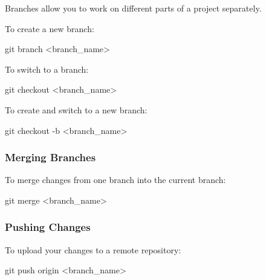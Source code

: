 \documentclass[
  letterpaper,
  DIV=11,
  numbers=noendperiod]{scrreprt}
\newenvironment{Shaded}{\begin{snugshade}}{\end{snugshade}}
\newcommand{\AttributeTok}[1]{\textcolor[rgb]{0.40,0.45,0.13}{#1}}
\newcommand{\FunctionTok}[1]{\textcolor[rgb]{0.28,0.35,0.67}{#1}}
\newcommand{\NormalTok}[1]{\textcolor[rgb]{0.00,0.23,0.31}{#1}}
\newcommand{\OperatorTok}[1]{\textcolor[rgb]{0.37,0.37,0.37}{#1}}
\begin{document}
Branches allow you to work on different parts of a project separately.

To create a new branch:

\begin{Shaded}
\begin{Highlighting}[]
\FunctionTok{git}\NormalTok{ branch }\OperatorTok{\textless{}}\NormalTok{branch\_name}\OperatorTok{\textgreater{}}
\end{Highlighting}
\end{Shaded}

To switch to a branch:

\begin{Shaded}
\begin{Highlighting}[]
\FunctionTok{git}\NormalTok{ checkout }\OperatorTok{\textless{}}\NormalTok{branch\_name}\OperatorTok{\textgreater{}}
\end{Highlighting}
\end{Shaded}

To create and switch to a new branch:

\begin{Shaded}
\begin{Highlighting}[]
\FunctionTok{git}\NormalTok{ checkout }\AttributeTok{{-}b} \OperatorTok{\textless{}}\NormalTok{branch\_name}\OperatorTok{\textgreater{}}
\end{Highlighting}
\end{Shaded}

\subsubsection{Merging Branches}\label{merging-branches}

To merge changes from one branch into the current branch:

\begin{Shaded}
\begin{Highlighting}[]
\FunctionTok{git}\NormalTok{ merge }\OperatorTok{\textless{}}\NormalTok{branch\_name}\OperatorTok{\textgreater{}}
\end{Highlighting}
\end{Shaded}

\subsubsection{Pushing Changes}\label{pushing-changes}

To upload your changes to a remote repository:

\begin{Shaded}
\begin{Highlighting}[]
\FunctionTok{git}\NormalTok{ push origin }\OperatorTok{\textless{}}\NormalTok{branch\_name}\OperatorTok{\textgreater{}}
\end{Highlighting}
\end{Shaded}
\end{document}
